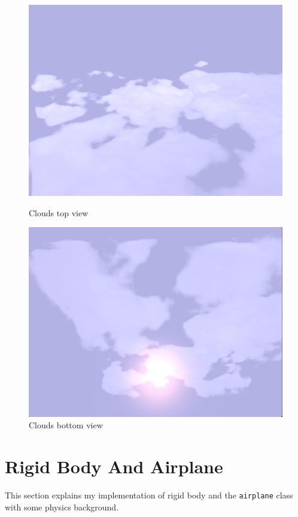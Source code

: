 \begin{figure}[H]
    \centering
    \begin{minipage}[t]{0.45\textwidth}
        \centering
        \includegraphics[width=\textwidth]{images/clouds1.png}
        \caption{Clouds top view}
    \end{minipage}
    \hfill
    \begin{minipage}[t]{0.45\textwidth}
        \centering
        \includegraphics[width=\textwidth]{images/clouds2.png}
        \caption{Clouds bottom view}
    \end{minipage}
\end{figure}

\section{Rigid Body And Airplane}
This section explains my implementation of rigid body and the \texttt{airplane} class with some physics background.

